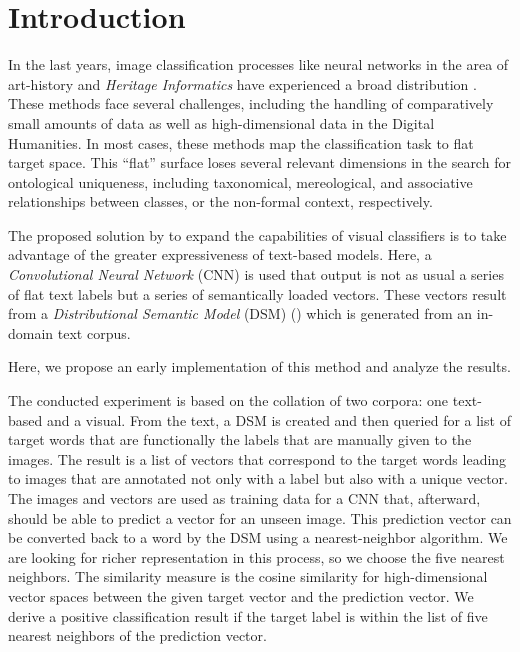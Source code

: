 \section{Introduction}
In the last years, image classification processes like neural networks in the area of art-history and \emph{Heritage Informatics} have experienced a broad distribution \parencite{lang_AttestingSimilaritySupportingOrganizationStudy_2018}.
These methods face several challenges, including the handling of comparatively small amounts of data as well as high-dimensional data in the Digital Humanities. In most cases, these methods map the classification task to flat target space. This \enquote{flat} surface loses several relevant dimensions in the search for ontological uniqueness, including taxonomical, mereological, and associative relationships between classes, or the non-formal context, respectively.

The proposed solution by \citeauthor{donig_VomBildTextUndWieder_2019a} \parencite{donig_VomBildTextUndWieder_2019a} to expand the capabilities of visual classifiers is to take advantage of the greater expressiveness of text-based models. Here, a \emph{Convolutional Neural Network} (CNN) is used that output is not as usual a series of flat text labels but a series of semantically loaded vectors. These vectors result from a \emph{Distributional Semantic Model} (DSM) (\cite{lenci_DistributionalModelsWordMeaning_2018a}) which is generated from an in-domain text corpus.


Here, we propose an early implementation of this method and analyze the results.

The conducted experiment is based on the collation of two corpora: one text-based and a visual. From the text, a DSM is created and then queried for a list of target words that are functionally the labels that are manually given to the images. The result is a list of vectors that correspond to the target words leading to images that are annotated not only with a label but also with a unique vector. The images and vectors are used as training data for a CNN that, afterward, should be able to predict a vector for an unseen image. This prediction vector can be converted back to a word by the DSM using a nearest-neighbor algorithm. We are looking for richer representation in this process, so we choose the five nearest neighbors. The similarity measure is the cosine similarity for high-dimensional vector spaces between the given target vector and the prediction vector. We derive a positive classification result if the target label is within the list of five nearest neighbors of the prediction vector.

